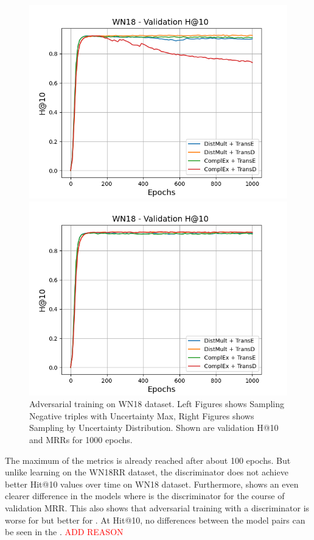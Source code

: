 \begin{figure}
\begin{minipage}{.5\textwidth}
    \end{minipage}
    \begin{minipage}{.5\textwidth}
      \centering
      \includegraphics[width=0.9\linewidth]{figures/results/gan_train/not_pretrained/uncertainty/max/entropy/wn18/1k_epochs/uncertainty_wn18_hit10.png}
    \end{minipage}%
    \begin{minipage}{.5\textwidth}
      \centering
      \includegraphics[width=0.9\linewidth]{figures/results/gan_train/not_pretrained/uncertainty/max_distribution/entropy/wn18/1k_epochs/uncertainty_wn18_hit10.png}
    \end{minipage}%
    \caption{Adversarial training on \textsc{WN18} dataset. 
    Left Figures shows Sampling Negative triples with Uncertainty Max, Right Figures shows Sampling by Uncertainty Distribution.
    Shown are validation H@10 and MRRs for 1000 epochs.}
    \label{fig:advtrain_wn18_usmax_ussoftmax}
\end{figure}
The maximum of the metrics is already reached after about 100 epochs.
But unlike learning on the \textsc{WN18RR} dataset, the discriminator does not achieve better Hit@10 values over time on \textsc{WN18} dataset.
Furthermore, \ussoftmax shows an even clearer difference in the models where \transd is the discriminator for the course of validation MRR.
This also shows that adversarial training with a \transd discriminator is worse for \usmax but better for \ussoftmax.
At Hit@10, no differences between the model pairs can be seen in the \ussoftmax.
\textcolor{red}{ADD REASON}

